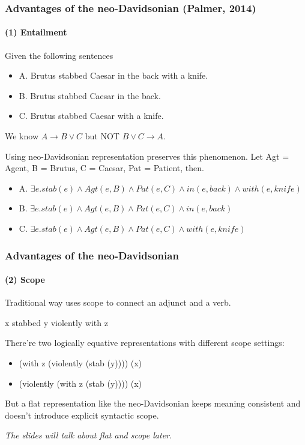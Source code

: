 \documentclass{beamer}
\begin{document}
\begin{frame}
    \frametitle{Advantages of the neo-Davidsonian (Palmer, 2014)}
    \framesubtitle{(1) Entailment}

    Given the following sentences

    \begin{itemize}
        \item A. Brutus stabbed Caesar
            {\color[rgb]{1,0,0} in the back}
            {\color[rgb]{0,0,1} with a knife}.
        \item B. Brutus stabbed Caesar {\color[rgb]{1,0,0}in the back}.
        \item C. Brutus stabbed Caesar {\color[rgb]{0,0,1}with a knife}.
    \end{itemize}

    We know $A \to B \vee C$ but \alert{NOT} $ B \vee C \to A$.

    \pause

    Using neo-Davidsonian representation preserves this phenomenon.  Let Agt = Agent, B = Brutus, C = Caesar, Pat = Patient, then.

    \begin{itemize}
        \item A. $\exists e . stab(e) \wedge Agt(e, B) \wedge Pat(e, C)
            \wedge in(e, back) \wedge with(e, knife)$

        \item B. $\exists e . stab(e) \wedge Agt(e, B) \wedge Pat(e, C)
            \wedge in(e, back)$

        \item C. $\exists e . stab(e) \wedge Agt(e, B) \wedge Pat(e, C)
            \wedge with(e, knife)$
    \end{itemize}
\end{frame}

\begin{frame}
    \frametitle{Advantages of the neo-Davidsonian}
    \framesubtitle{(2) Scope}

    Traditional way uses scope to connect an adjunct and a verb.

    \begin{center}
        x stabbed y violently with z
    \end{center}

    There're two logically equative representations with different scope settings:

    \begin{itemize}
        \item (with z (violently (stab (y)))) (x)
        \item (violently (with z (stab (y)))) (x)
    \end{itemize}

    But a flat representation like the neo-Davidsonian keeps
    meaning consistent and doesn't introduce explicit syntactic scope.

    {\it The slides will talk about \alert{flat} and \alert{scope} later}.

\end{frame}
\end{document}
